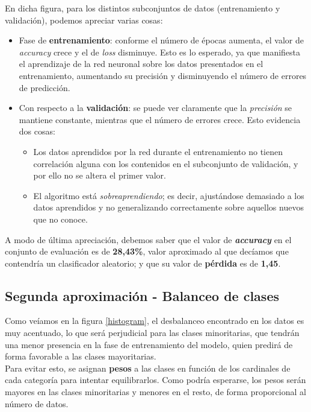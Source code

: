\documentclass[]{article}
\begin{document}
		En dicha figura, para los distintos subconjuntos de datos (entrenamiento y validación), podemos apreciar varias cosas:
		
		\begin{itemize}
			\item Fase de \textbf{entrenamiento}: conforme el número de épocas aumenta, el valor de \textit{accuracy} crece y el de \textit{loss} disminuye. Esto es lo esperado, ya que manifiesta el aprendizaje de la red neuronal sobre los datos presentados en el entrenamiento, aumentando su precisión y disminuyendo el número de errores de predicción.
			\item Con respecto a la \textbf{validación}: se puede ver claramente que la \textit{precisión} se mantiene constante, mientras que el número de errores crece. Esto evidencia dos cosas: \begin{itemize}
				\item Los datos aprendidos por la red durante el entrenamiento no tienen correlación alguna con los contenidos en el subconjunto de validación, y por ello no se altera el primer valor.
				\item El algoritmo está \textit{sobreaprendiendo}; es decir, ajustándose demasiado a los datos aprendidos y no generalizando correctamente sobre aquellos nuevos que no conoce.
			\end{itemize}
		\end{itemize}
	
		A modo de última apreciación, debemos saber que el valor de \textit{\textbf{accuracy}} en el conjunto de evaluación es de \textbf{28,43\%}, valor aproximado al que decíamos que contendría un clasificador aleatorio; y que su valor de \textbf{pérdida} es de \textbf{1,45}.
		
	\subsection{Segunda aproximación - Balanceo de clases}
	\label{balanceo-clases-subsection}
	
		Como veíamos en la figura \ref{histogram}, el desbalanceo encontrado en los datos es muy acentuado, lo que será perjudicial para las clases minoritarias, que tendrán una menor presencia en la fase de entrenamiento del modelo, quien predirá de forma favorable a las clases mayoritarias.\\
		
		Para evitar esto, se asignan \textbf{pesos} a las clases en función de los cardinales de cada categoría para intentar equilibrarlos. Como podría esperarse, los pesos serán mayores en las clases minoritarias y menores en el resto, de forma proporcional al número de datos.\\
		
\end{document}
